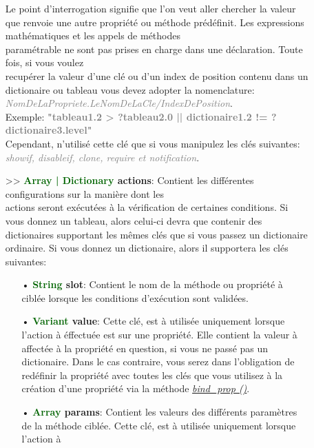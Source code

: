 \documentclass[a4paper, 11pt]{article}
\begin{document}
\begin{description}
\begin{itemize}
		    Le point d'interrogation signifie que l'on veut aller chercher la valeur que renvoie une autre 
		    propriété ou méthode prédéfinit. Les expressions mathématiques et les appels de méthodes
		    \\paramétrable ne sont pas prises en charge dans une déclaration. Toute fois, si vous voulez
		    \\recupérer la valeur d'une clé ou d'un index de position contenu dans un dictionaire ou tableau 
		    vous devez adopter la nomenclature:
		    \textit{\textcolor {gray}{NomDeLaPropriete.LeNomDeLaCle/IndexDePosition}}. \\Exemple:
		    \textbf{\textcolor {gray}{"tableau1.2 > ?tableau2.0 || dictionaire1.2 != ?dictionaire3.level"}}
		   	\\Cependant, n'utilisé cette clé que si vous manipulez les clés suivantes:
		    \textit{\textcolor {gray}{showif, disableif, clone, require et notification}}.\\
			\item[>> \textbf{\textcolor{darkgreen}{Array | Dictionary} actions}:] Contient les différentes
			configurations sur la manière dont les \\actions seront exécutées à la vérification de certaines 
			conditions. Si vous donnez un tableau, alors celui-ci devra que contenir des dictionaires 
			supportant les mêmes clés que si vous passez un dictionaire ordinaire. Si vous donnez un 
			dictionaire, alors il supportera les clés suivantes:
		    \begin{itemize}
		    	\item[• \textbf{\textcolor{darkgreen}{String} slot}:] Contient le nom de la méthode ou 
		    	propriété à ciblée lorsque les conditions d'exécution sont validées.\\
		    	\newpage \item[• \textbf{\textcolor{darkgreen}{Variant} value}:] Cette clé, est à utilisée 
		    	uniquement lorsque l'action à éffectuée est sur une propriété. Elle contient la valeur à
		    	affectée à la propriété en question, si vous ne passé pas un dictionaire. Dans le cas
		    	contraire, vous serez dans l'obligation de redéfinir la propriété avec toutes les clés que
		    	vous utilisez à la création d'une propriété via la méthode \textit{\textcolor {blue}
		    	{\hyperlink{bindprop}{bind\_prop ()}}}.\\
		    	\item[• \textbf{\textcolor{darkgreen}{Array} params}:] Contient les valeurs des différents 
		    	paramètres de la méthode ciblée. Cette clé, est à utilisée uniquement lorsque l'action à 

\end{itemize}
\end{itemize}
\end{description}
\end{document}

